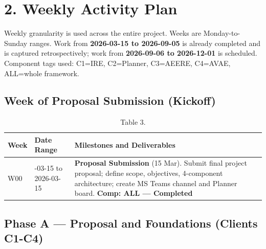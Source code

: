 \documentclass[10pt,journal,onecolumn]{IEEEtran}
\begin{document}
\section{2. Weekly Activity Plan}

Weekly granularity is used across the entire project. Weeks are Monday-to-Sunday ranges. Work from \textbf{2026-03-15 to 2026-09-05} is already completed and is captured retrospectively; work from \textbf{2026-09-06 to 2026-12-01} is scheduled. Component tags used: C1=IRE, C2=Planner, C3=AEERE, C4=AVAE, ALL=whole framework.

\subsection{Week of Proposal Submission (Kickoff)}

\begin{table}[h]
\caption{Table 3.}
\label{tab:t3}
\begin{tabularx}{\columnwidth}{l >{\raggedright\arraybackslash}X >{\raggedright\arraybackslash}X}
\toprule
\textbf{Week} & \textbf{Date Range} & \textbf{Milestones and Deliverables}\\
\midrule
W00 & 2026-03-15 to 2026-03-15 & \textbf{Proposal Submission} (15 Mar). Submit final project proposal; define scope, objectives, 4-component architecture; create MS Teams channel and Planner board. \textbf{Comp: ALL --- Completed}\\
\bottomrule
\end{tabularx}
\end{table}

\subsection{Phase A --- Proposal and Foundations (Clients C1-C4)}
\end{document}

